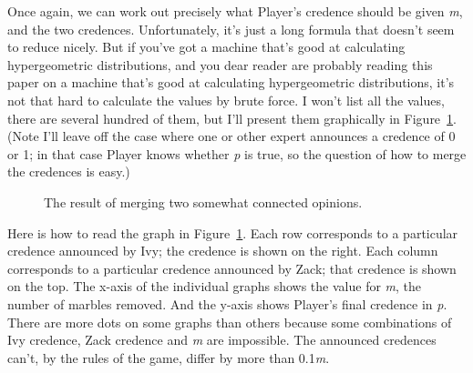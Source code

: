 \documentclass[
  10pt,
  letterpaper,
  DIV=11,
  numbers=noendperiod,
  twoside]{scrartcl}
\begin{document}
Once again, we can work out precisely what Player's credence should be
given \emph{m}, and the two credences. Unfortunately, it's just a long
formula that doesn't seem to reduce nicely. But if you've got a machine
that's good at calculating hypergeometric distributions, and you dear
reader are probably reading this paper on a machine that's good at
calculating hypergeometric distributions, it's not that hard to
calculate the values by brute force. I won't list all the values, there
are several hundred of them, but I'll present them graphically in
Figure~\ref{fig-conexp}. (Note I'll leave off the case where one or
other expert announces a credence of 0 or 1; in that case Player knows
whether \emph{p} is true, so the question of how to merge the credences
is easy.)

\begin{figure}


\caption{\label{fig-conexp}The result of merging two somewhat connected
opinions.}

\end{figure}%

Here is how to read the graph in Figure~\ref{fig-conexp}. Each row
corresponds to a particular credence announced by Ivy; the credence is
shown on the right. Each column corresponds to a particular credence
announced by Zack; that credence is shown on the top. The x-axis of the
individual graphs shows the value for \emph{m}, the number of marbles
removed. And the y-axis shows Player's final credence in \emph{p}. There
are more dots on some graphs than others because some combinations of
Ivy credence, Zack credence and \emph{m} are impossible. The announced
credences can't, by the rules of the game, differ by more than
0.1\emph{m}.
\end{document}
